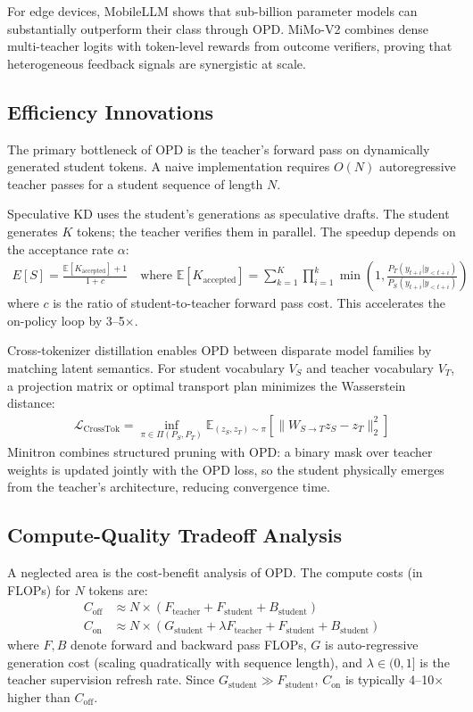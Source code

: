 \documentclass{article} %
\begin{document}
For edge devices, MobileLLM \citep{2509.24945} shows that sub-billion parameter models can substantially outperform their class through OPD. MiMo-V2 \citep{2601.02780} combines dense multi-teacher logits with token-level rewards from outcome verifiers, proving that heterogeneous feedback signals are synergistic at scale.

\subsection{Efficiency Innovations}
The primary bottleneck of OPD is the teacher's forward pass on dynamically generated student tokens. A naive implementation requires $O(N)$ autoregressive teacher passes for a student sequence of length $N$.

Speculative KD \citep{2410.11325, 2510.24021} uses the student's generations as speculative drafts. The student generates $K$ tokens; the teacher verifies them in parallel. The speedup depends on the acceptance rate $\alpha$:
\begin{align}
E[S] = \frac{\mathbb{E}[K_{\text{accepted}}] + 1}{1 + c} \quad \text{where } \mathbb{E}[K_{\text{accepted}}] = \sum_{k=1}^K \prod_{i=1}^k \min \left(1, \frac{P_T(y_{t+i} | y_{<t+i})}{P_S(y_{t+i} | y_{<t+i})} \right)
\end{align}
where $c$ is the ratio of student-to-teacher forward pass cost. This accelerates the on-policy loop by 3--5$\times$.

Cross-tokenizer distillation \citep{2402.12030} enables OPD between disparate model families by matching latent semantics. For student vocabulary $V_S$ and teacher vocabulary $V_T$, a projection matrix or optimal transport plan minimizes the Wasserstein distance:
\begin{align}
\mathcal{L}_{\text{CrossTok}} = \inf_{\pi \in \Pi(P_S, P_T)} \mathbb{E}_{(z_S, z_T) \sim \pi} \left[ \parallel W_{S \to T} z_S - z_T \parallel_2^2 \right]
\end{align}
Minitron \citep{2407.14679} combines structured pruning with OPD: a binary mask over teacher weights is updated jointly with the OPD loss, so the student physically emerges from the teacher's architecture, reducing convergence time.

\subsection{Compute-Quality Tradeoff Analysis}
A neglected area is the cost-benefit analysis of OPD. The compute costs (in FLOPs) for $N$ tokens are:
\begin{align}
C_{\text{off}} &\approx N \times (F_{\text{teacher}} + F_{\text{student}} + B_{\text{student}}) \\
C_{\text{on}} &\approx N \times \left( G_{\text{student}} + \lambda F_{\text{teacher}} + F_{\text{student}} + B_{\text{student}} \right)
\end{align}
where $F, B$ denote forward and backward pass FLOPs, $G$ is auto-regressive generation cost (scaling quadratically with sequence length), and $\lambda \in (0, 1]$ is the teacher supervision refresh rate. Since $G_{\text{student}} \gg F_{\text{student}}$, $C_{\text{on}}$ is typically 4--10$\times$ higher than $C_{\text{off}}$.
\end{document}
